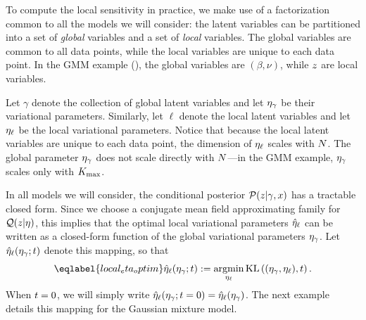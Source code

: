 To compute the local sensitivity in practice, we make use of a factorization
common to all the models we will consider: the latent variables can be
partitioned into a set of \textit{global} variables and a set of \textit{local}
variables. The global variables are common to all data points, while the
local variables are unique to each data point. In the GMM example
(), the global variables are $(\beta, \nu)$, while $z$
are local variables.

Let $\gamma$ denote the collection of global latent variables and let $\eta_{\gamma}$
be their variational parameters. Similarly, let $\ell$ denote the local latent
variables and let $\eta_{\ell}$ be the local variational parameters. Notice that
because the local latent variables are unique to each data point, the dimension
of $\eta_{\ell}$ scales with $N$. The global parameter $\eta_{\gamma}$ does not scale
directly with $N$---in the GMM example, $\eta_{\gamma}$ scales only with ${K_{\mathrm{max}}}$.

In all models we will consider, the conditional posterior $\mathcal{P}(z \vert
\gamma,x)$ has a tractable closed form.  Since we choose a conjugate mean field
approximating family for $\mathcal{Q}(z \vert \eta)$, this implies that the optimal
local variational parameters $\hat\eta_{\ell}$ can be written as a closed-form
function of the global variational parameters $\eta_{\gamma}$.  Let
$\hat\eta_{\ell}(\eta_\gamma; t)$ denote this mapping, so that
%
\begin{align}\eqlabel{local_eta_optim}
\etaoptlocal(\etaglob; \t) :=
    \argmin_{\etalocal} \KL{(\eta_\gamma, \etalocal), \t}.
\end{align}
%
When $t=0$, we will simply write $\hat\eta_{\ell}(\eta_{\gamma}; t=0) =
\hat\eta_{\ell}(\eta_{\gamma})$. The next example details this mapping for the Gaussian
mixture model.

